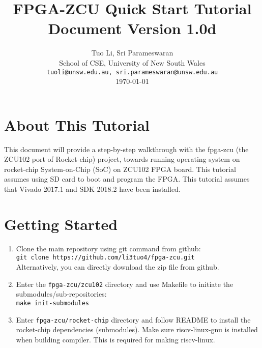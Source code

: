 \documentclass[a4paper,11pt]{article}
\begin{document}
\title{\vspace{-0.7in}\Large {\bf FPGA-ZCU Quick Start Tutorial} \\
Document Version 1.0d
  \vspace{-0.1in}}

\author{Tuo Li, Sri Parameswaran\\
  School of CSE, University of New South Wales \\
  {\tt tuoli@unsw.edu.au, sri.parameswaran@unsw.edu.au} \\
  \today
}
\date{} 

\newpage

\maketitle

\newpage

\section*{About This Tutorial}
This document will provide a step-by-step walkthrough with the fpga-zcu (the ZCU102 port of Rocket-chip) project, towards running operating system on rocket-chip System-on-Chip (SoC) on ZCU102 FPGA board. 
This tutorial assumes using SD card to boot and program the FPGA.
This tutorial assumes that Vivado 2017.1 and SDK 2018.2 have been installed. 
\newpage

\section{Getting Started}

\begin{enumerate}
\item Clone the main repository using git command from github:\\
 {\tt git clone https://github.com/li3tuo4/fpga-zcu.git}\\
 Alternatively, you can directly download the zip file from github.
\item Enter the {\tt fpga-zcu/zcu102} directory and use Makefile to initiate the submodules/sub-repositories:\\
 {\tt make init-submodules}
 \item Enter {\tt fpga-zcu/rocket-chip} directory and follow README to install the rocket-chip dependencies (submodules). Make sure riscv-linux-gnu is installed when building compiler. This is required for making riscv-linux.
\end{enumerate}
\end{document}
